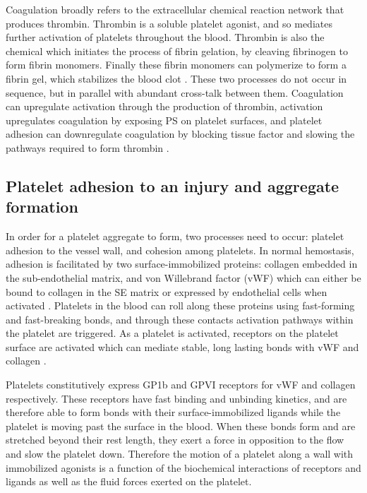 Coagulation broadly refers to the extracellular chemical reaction
network that produces thrombin. Thrombin is a soluble platelet
agonist, and so mediates further activation of platelets throughout
the blood. Thrombin is also the chemical which initiates the process
of fibrin gelation, by cleaving fibrinogen to form fibrin
monomers. Finally these fibrin monomers can polymerize to form a
fibrin gel, which stabilizes the blood clot \cite{Fogelson2015}. These
two processes do not occur in sequence, but in parallel with abundant
cross-talk between them. Coagulation can upregulate activation through
the production of thrombin, activation upregulates coagulation by
exposing PS on platelet surfaces, and platelet adhesion can
downregulate coagulation by blocking tissue factor and slowing the
pathways required to form thrombin \cite{Kuharsky2001}. 


\subsection{Platelet adhesion to an injury and aggregate formation}
\label{sec:platelet-adhesion}

In order for a platelet aggregate to form, two processes need to
occur: platelet adhesion to the vessel wall, and cohesion among
platelets. In normal hemostasis, adhesion is facilitated by two
surface-immobilized proteins: collagen embedded in the sub-endothelial
matrix, and von Willebrand factor (vWF) which can either be bound to
collagen in the SE matrix or expressed by endothelial cells when
activated \cite{Fogelson2015}. Platelets in the blood can roll along
these proteins using fast-forming and fast-breaking bonds, and through
these contacts activation pathways within the platelet are
triggered. As a platelet is activated, receptors on the platelet
surface are activated which can mediate stable, long lasting bonds
with vWF and collagen \cite{Bye2016,Li2010,Fogelson2015,Qiu2015}. 
		
Platelets constitutively express GP1b and GPVI receptors for vWF and
collagen respectively. These receptors have fast binding and unbinding
kinetics, and are therefore able to form bonds with their
surface-immobilized ligands while the platelet is moving past the
surface in the blood. When these bonds form and are stretched beyond
their rest length, they exert a force in opposition to the flow and
slow the platelet down. Therefore the motion of a platelet along a
wall with immobilized agonists is a function of the biochemical
interactions of receptors and ligands as well as the fluid forces
exerted on the platelet.
		
